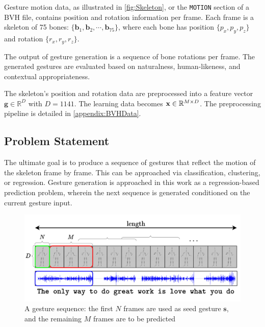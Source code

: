 Gesture motion data, as illustrated in \autoref{fig:Skeleton}, or the \texttt{MOTION} section of a BVH file, contains position and rotation information per frame. Each frame is a skeleton of 75 bones: $\{ \mathbf{b}_{1}, \mathbf{b}_{2}, \cdots , \mathbf{b}_{75} \}$, where each bone has position $\{ p_{x}, p_{y}, p_{z} \}$ and rotation $\{ r_{x}, r_{y}, r_{z} \}$.

The output of gesture generation is a sequence of bone rotations per frame. The generated gestures are evaluated based on naturalness, human-likeness, and contextual appropriateness.

The skeleton's position and rotation data are preprocessed into a feature vector $\mathbf{g} \in \mathbb{R}^{D}$ with $D = 1141$. The learning data becomes $\mathbf{x} \in \mathbb{R}^{M \times D}$. The preprocessing pipeline is detailed in \autoref{appendix:BVHData}.

\subsection{Problem Statement}
\label{sec:ProblemStatement}

The ultimate goal is to produce a sequence of gestures that reflect the motion of the skeleton frame by frame. This can be approached via classification, clustering, or regression. Gesture generation is approached in this work as a regression-based prediction problem, wherein the next sequence is generated conditioned on the current gesture input.

\begin{figure}[h]
	\centering
 	\includegraphics[width=\linewidth]{images/FeatureProcessing}
	\caption{A gesture sequence: the first $N$ frames are used as seed gesture $\mathbf{s}$, and the remaining $M$ frames are to be predicted}
	\label{fig:GestureSeries}
\end{figure}

